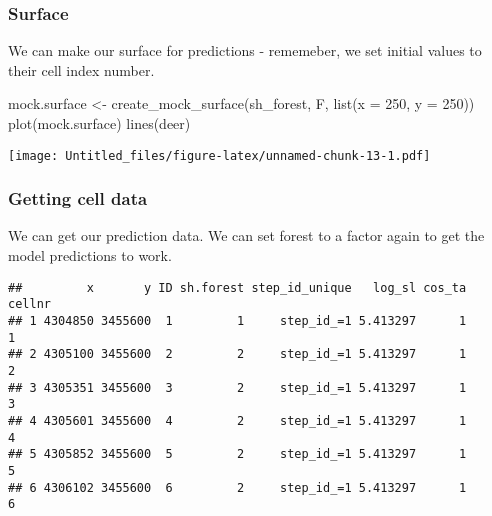 \documentclass[
]{article}
\newenvironment{Shaded}{\begin{snugshade}}{\end{snugshade}}
\newcommand{\AttributeTok}[1]{\textcolor[rgb]{0.77,0.63,0.00}{#1}}
\newcommand{\DecValTok}[1]{\textcolor[rgb]{0.00,0.00,0.81}{#1}}
\newcommand{\FloatTok}[1]{\textcolor[rgb]{0.00,0.00,0.81}{#1}}
\newcommand{\FunctionTok}[1]{\textcolor[rgb]{0.00,0.00,0.00}{#1}}
\newcommand{\NormalTok}[1]{#1}
\newcommand{\OtherTok}[1]{\textcolor[rgb]{0.56,0.35,0.01}{#1}}
\newcommand{\SpecialCharTok}[1]{\textcolor[rgb]{0.00,0.00,0.00}{#1}}
\begin{document}
\hypertarget{surface}{%
\subsubsection{Surface}\label{surface}}

We can make our surface for predictions - rememeber, we set initial
values to their cell index number.

\begin{Shaded}
\begin{Highlighting}[]
\NormalTok{mock.surface }\OtherTok{\textless{}{-}} \FunctionTok{create\_mock\_surface}\NormalTok{(sh\_forest, F, }\FunctionTok{list}\NormalTok{(}\AttributeTok{x =} \DecValTok{250}\NormalTok{, }\AttributeTok{y =} \DecValTok{250}\NormalTok{))}
\FunctionTok{plot}\NormalTok{(mock.surface)}
\FunctionTok{lines}\NormalTok{(deer)}
\end{Highlighting}
\end{Shaded}

\texttt{[image: Untitled\_files/figure-latex/unnamed-chunk-13-1.pdf]}

\hypertarget{getting-cell-data}{%
\subsubsection{Getting cell data}\label{getting-cell-data}}

We can get our prediction data. We can set forest to a factor again to
get the model predictions to work.

\begin{Shaded}
\end{Shaded}

\begin{verbatim}
##         x       y ID sh.forest step_id_unique   log_sl cos_ta cellnr
## 1 4304850 3455600  1         1     step_id_=1 5.413297      1      1
## 2 4305100 3455600  2         2     step_id_=1 5.413297      1      2
## 3 4305351 3455600  3         2     step_id_=1 5.413297      1      3
## 4 4305601 3455600  4         2     step_id_=1 5.413297      1      4
## 5 4305852 3455600  5         2     step_id_=1 5.413297      1      5
## 6 4306102 3455600  6         2     step_id_=1 5.413297      1      6
\end{verbatim}
\end{document}
